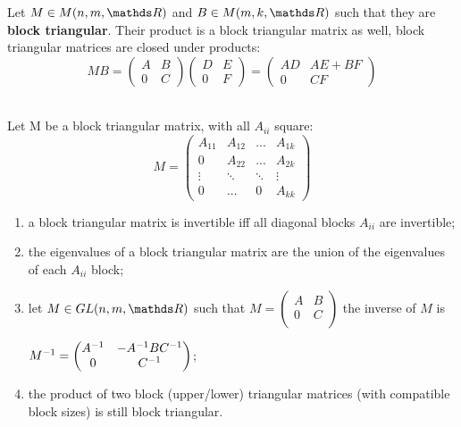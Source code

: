 \documentclass[ComputationalMathematics.tex]{subfiles}
\begin{document}
\begin{proposition}
  Let $M \in M(n, m, \R)$ and $B \in M(m, k, \R)$ such that they are \textbf{block triangular}.
  Their product is a block triangular matrix as well, block triangular matrices
are closed under products:
  $$M B 
  = \begin{pmatrix}
    A & B\\
    0 & C
  \end{pmatrix}
  \begin{pmatrix}
    D & E\\
    0 & F
  \end{pmatrix}
  = 
  \begin{pmatrix}
    AD & AE + BF\\
    0 & CF
  \end{pmatrix}$$
\end{proposition}

\begin{proposition}~\\
    Let M be a block triangular matrix, with all $A_{ii}$ square:
    $$M 
      = \begin{pmatrix}
        A_{11}  & A_{12} & ... & A_{1k}\\
        0       & A_{22} & ... & A_{2k}\\
        \vdots  &\ddots & \ddots & \vdots\\
        0       & ... & 0 & A_{kk}
      \end{pmatrix}$$ 
    \begin{enumerate}
      \item a block triangular matrix is invertible iff all diagonal blocks $A_{ii}$ are invertible;
      \item the eigenvalues of a block triangular matrix are the union of the eigenvalues of each $A_{ii}$ block;
      \item let $M \in GL(n, m, \R)$ such that $M= 
        \begin{pmatrix}
          A & B\\
          0 & C\\
        \end{pmatrix}$ 
       the inverse of $M$ is 
        
        ${M}^{-1} = 
        \begin{pmatrix}
          {A}^{-1} & -{A}^{-1}B{C}^{-1}\\
          0 & {C}^{-1}
        \end{pmatrix}$;
      \item the product of two block (upper/lower) triangular matrices
(with compatible block sizes) is still block triangular.
    \end{enumerate}
  \end{proposition}
\end{document}
